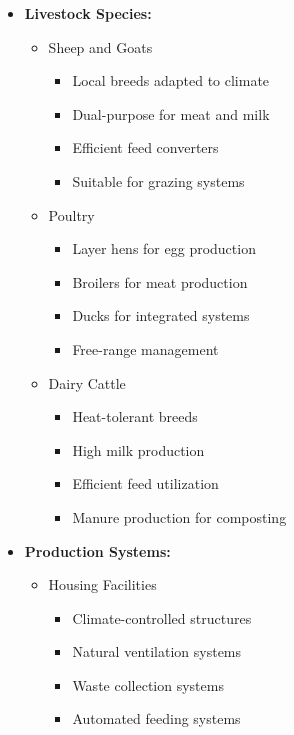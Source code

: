 \begin{itemize}
    \item \textbf{Livestock Species:}
    \begin{itemize}
        \item Sheep and Goats
        \begin{itemize}
            \item Local breeds adapted to climate
            \item Dual-purpose for meat and milk
            \item Efficient feed converters
            \item Suitable for grazing systems
        \end{itemize}
        
        \item Poultry
        \begin{itemize}
            \item Layer hens for egg production
            \item Broilers for meat production
            \item Ducks for integrated systems
            \item Free-range management
        \end{itemize}
        
        \item Dairy Cattle
        \begin{itemize}
            \item Heat-tolerant breeds
            \item High milk production
            \item Efficient feed utilization
            \item Manure production for composting
        \end{itemize}
    \end{itemize}
    
    \item \textbf{Production Systems:}
    \begin{itemize}
        \item Housing Facilities
        \begin{itemize}
            \item Climate-controlled structures
            \item Natural ventilation systems
            \item Waste collection systems
            \item Automated feeding systems
        \end{itemize}
        

\end{itemize}
\end{itemize}

